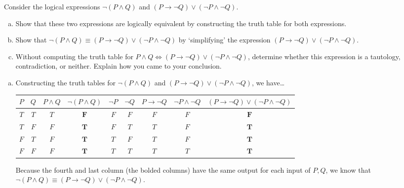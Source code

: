 \documentclass[12pt,letterpaper]{exam}
\begin{document}
\examtitle
{} 
\scores
\bottomline
\newpage

\begin{questions}

\newpage
\question[10] Consider the logical expressions $\neg (P \wedge Q)$ and $(P \to \neg Q) \vee (\neg P \wedge \neg Q)$.
	\begin{enumerate}[(a)]
	\item Show that these two expressions are logically equivalent by constructing the truth table for both expressions. 
	\item Show that $\neg (P \wedge Q) \equiv (P \to \neg Q) \vee (\neg P \wedge \neg Q)$ by `simplifying' the expression $(P \to \neg Q) \vee (\neg P \wedge \neg Q)$. 
	\item Without computing the truth table for $P \wedge Q \Leftrightarrow (P \to \neg Q) \vee (\neg P \wedge \neg Q)$, determine whether this expression is a tautology, contradiction, or neither. Explain how you came to your conclusion. 
	\end{enumerate} \pspace

\sol 
\begin{enumerate}[(a)]
\item Constructing the truth tables for $\neg (P \wedge Q)$ and $(P \to \neg Q) \vee (\neg P \wedge \neg Q)$, we have\dots
	\begin{table}[H]
	\centering
	\begin{tabular}{cc||cc|ccccc}
	$P$ & $Q$ & $P \wedge Q$ & $\neg (P \wedge Q)$ & $\neg P$ & $\neg Q$ & $P \to \neg Q$ & $\neg P \wedge \neg Q$ & $(P \to \neg Q) \vee (\neg P \wedge \neg Q)$ \\ \hline 
	$T$ & $T$ & $T$ & $\mathbf{F}$ & $F$ & $F$ & $F$ & $F$ & $\mathbf{F}$ \\
	$T$ & $F$ & $F$ & $\mathbf{T}$ & $F$ & $T$ & $T$ & $F$ & $\mathbf{T}$ \\
	$F$ & $T$ & $F$ & $\mathbf{T}$ & $T$ & $F$ & $T$ & $F$ & $\mathbf{T}$ \\
	$F$ & $F$ & $F$ & $\mathbf{T}$ & $T$ & $T$ & $T$ & $T$ & $\mathbf{T}$ \\
	\end{tabular}
	\end{table}
Because the fourth and last column (the bolded columns) have the same output for each input of $P, Q$, we know that $\neg (P \wedge Q) \equiv (P \to \neg Q) \vee (\neg P \wedge \neg Q)$. \pspace


\end{enumerate}
\end{questions}
\end{document}
